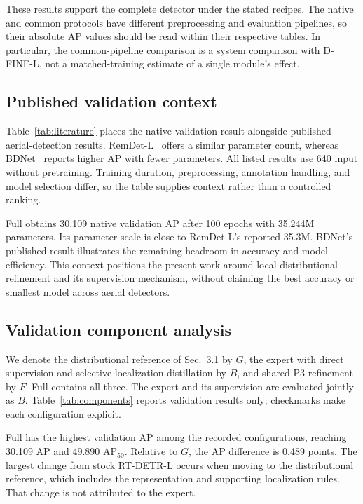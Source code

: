
These results support the complete detector under the stated recipes. The native and common protocols have different preprocessing and evaluation pipelines, so their absolute AP values should be read within their respective tables. In particular, the common-pipeline comparison is a system comparison with D-FINE-L, not a matched-training estimate of a single module's effect.

\subsection{Published validation context}
Table~\ref{tab:literature} places the native validation result alongside published aerial-detection results. RemDet-L~\cite{li2025remdet} offers a similar parameter count, whereas BDNet~\cite{guan2026bdnet} reports higher AP with fewer parameters. All listed results use 640 input without pretraining. Training duration, preprocessing, annotation handling, and model selection differ, so the table supplies context rather than a controlled ranking.


Full obtains 30.109 native validation AP after 100 epochs with 35.244M parameters. Its parameter scale is close to RemDet-L's reported 35.3M. BDNet's published result illustrates the remaining headroom in accuracy and model efficiency. This context positions the present work around local distributional refinement and its supervision mechanism, without claiming the best accuracy or smallest model across aerial detectors.

\subsection{Validation component analysis}
We denote the distributional reference of Sec.~3.1 by $G$, the expert with direct supervision and selective localization distillation by $B$, and shared P3 refinement by $F$. Full contains all three. The expert and its supervision are evaluated jointly as $B$. Table~\ref{tab:components} reports validation results only; checkmarks make each configuration explicit.


Full has the highest validation AP among the recorded configurations, reaching 30.109 AP and 49.890 $\mathrm{AP}_{50}$. Relative to $G$, the AP difference is 0.489 points. The largest change from stock RT-DETR-L occurs when moving to the distributional reference, which includes the representation and supporting localization rules. That change is not attributed to the expert.

